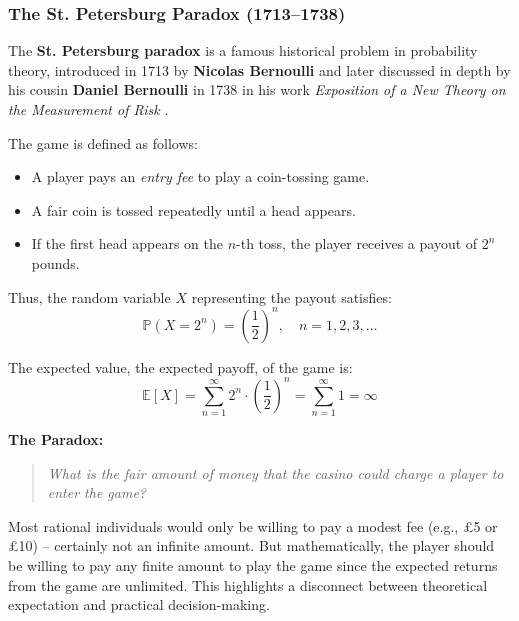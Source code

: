 \subsubsection{The St. Petersburg Paradox (1713–1738)}

The \textbf{St. Petersburg paradox} is a famous historical problem in probability theory, introduced in 1713 by \textbf{Nicolas Bernoulli} and later discussed in depth by his cousin \textbf{Daniel Bernoulli} in 1738 in his work \textit{Exposition of a New Theory on the Measurement of Risk} \cite{Bernoulli1738}.

\medskip

\noindent
The game is defined as follows:

\begin{itemize}
    \item A player pays an \textit{entry fee} to play a coin-tossing game.
    \item A fair coin is tossed repeatedly until a head appears.
    \item If the first head appears on the \(n\)-th toss, the player receives a payout of \( 2^n \) pounds.
\end{itemize}

\noindent
Thus, the random variable \( X \) representing the payout satisfies:
\[
\mathbb{P}(X = 2^n) = \left( \frac{1}{2} \right)^n, \quad n = 1, 2, 3, \dots
\]

\medskip

\noindent
The expected value, the expected payoff, of the game is:
\[
\mathbb{E}[X] = \sum_{n=1}^{\infty} 2^n \cdot \left( \frac{1}{2} \right)^n = \sum_{n=1}^{\infty} 1 = \infty
\]


\noindent
\textbf{The Paradox:} 

\vspace{-0.5em}
\begin{quote}
    \textit{What is the fair amount of money that the casino could charge a player to enter the game?}
\end{quote}

\noindent
Most rational individuals would only be willing to pay a modest fee (e.g., £5 or £10) -- certainly not an infinite amount. But mathematically, the player should be willing to pay any finite amount to play the game since the expected returns from the game are unlimited. This highlights a disconnect between theoretical expectation and practical decision-making.


